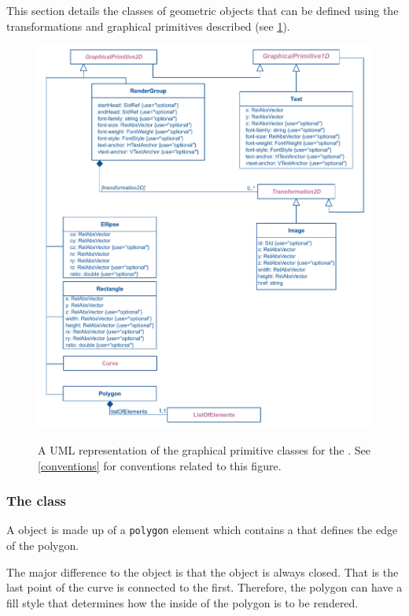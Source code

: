This section details the classes of geometric objects that can be defined using 
the transformations and graphical primitives described (see \ref{fig:group_render_uml}).

\begin{figure}[h!]
  \centering
  \includegraphics{images/render-group-uml}\\
  \caption{A UML representation of the graphical primitive classes for the \RenderPackage.  See \ref{conventions} for conventions related to this figure. }
  \label{fig:group_render_uml}
\end{figure}


\subsubsection{The  class}
\label{polygon-class}

A \Polygon object is made up of a \texttt{polygon} element which contains a 
\ListOfElements that defines the edge of the polygon.

The major difference to the \RenderCurve 
object is that the object is always closed. 
That is the last point of the curve is connected to the first.
Therefore, the polygon can have a fill style 
that determines how the inside of the polygon is to be rendered.

